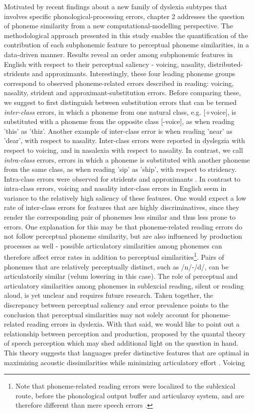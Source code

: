 Motivated by recent findings about a new family of dyslexia subtypes that involves specific phonological-processing errors, chapter 2 addresses the question of phoneme similarity from a new computational-modelling perspective. The methodological approach presented in this study enables the quantification of the contribution of each subphonemic feature to perceptual phoneme similarities, in a data-driven manner. Results reveal an order among subphonemic features in English with respect to their perceptual saliency - voicing, nasality, distributed-stridents and approximants. Interestingly, these four leading phoneme groups correspond to observed phoneme-related errors described in reading: voicing, nasality, strident and approximant-substitution errors. Before comparing these, we suggest to first distinguish between substitution errors that can be termed \textit{inter-class} errors, in which a phoneme from one natural class, e.g. [+voice], is substituted with a phoneme from the opposite class [-voice], as when reading 'this' as 'thiz'. Another example of inter-class error is when reading 'near' as 'dear', with respect to nasality. Inter-class errors were reported in dyslegzia with respect to voicing, and in nasalexia with respect to nasality. In contrast, we call \textit{intra-class} errors, errors in which a phoneme is substituted with another phoneme from the same class, as when reading 'sip' as 'ship', with respect to stridency. Intra-class errors were observed for stridents and approximants \citep[unpublished]{friedmann}. In contrast to intra-class errors, voicing and nasality inter-class errors in English seem in variance to the relatively high saliency of these features. One would expect a low rate of inter-class errors for features that are highly discriminatives, since they render the corresponding pair of phonemes less similar and thus less prone to errors. One explanation for this may be that phoneme-related reading errors do not follow perceptual phoneme similarity, but are also influenced by production processes as well - possible articulatory similarities among phonemes can therefore affect error rates in addition to perceptual similarities\footnote{Note that phoneme-related reading errors were localized to the sublexical route, before the phonological output buffer and articularoy system, and are therefore different than mere speech errors \citep{Gvion2010}.}. Pairs of phonemes that are relatively perceptually distinct, such as /n/-/d/, can be articulatorily similar (velum lowering in this case). The role of perceptual and articulatory similarities among phonemes in sublexcial reading, silent or reading aloud, is yet unclear and requires future research. Taken together, the discrepancy between perceptual saliency and error prevalence points to the conclusion that perceptual similarities may not solely account for phoneme-related reading errors in dyslexia. With that said, we would like to point out a relationship between perception and production, proposed by the quantal theory of speech perception which may shed additional light on the question in hand. This theory suggests that languages prefer distinctive features that are optimal in maximizing acoustic dissimilarities while minimizing articulatory effort \citep{stevens1989quantal, stevens2002toward}. Voicing 